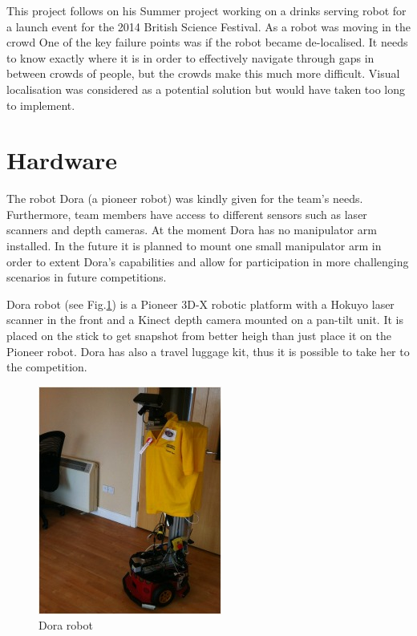 \documentclass[conference]{IEEEtran}
\begin{document}
This project follows on his Summer project working on a drinks serving robot for a launch event for the 2014 British Science Festival. As a robot was moving in the crowd One of the key failure points was if the robot became de-localised. It needs to know exactly where it is in order to effectively navigate through gaps in between crowds of people, but the crowds make this much more difficult. Visual localisation was considered as a potential solution but would have taken too long to implement.

\section{Hardware}
The robot Dora (a pioneer robot) was kindly given for the team's needs. Furthermore, team members have access to different sensors such as laser scanners and depth cameras. At the moment Dora has no manipulator arm installed. In the future it is planned to mount one small manipulator arm in order to extent Dora's capabilities and allow for participation in more challenging scenarios in future competitions.

Dora robot (see Fig.\ref{fig:dora}) is a Pioneer 3D-X robotic platform with a Hokuyo laser scanner in the front and a Kinect depth camera mounted on a pan-tilt unit. It is placed on the stick to get snapshot from better heigh than just place it on the Pioneer robot. Dora has also a travel luggage kit, thus it is possible to take her to the competition.


\begin{figure}[!t]
\centering
\includegraphics[width=3.in]{dorafinal.jpg}
\caption{Dora robot}
\label{fig:dora}
\end{figure}
\end{document}
